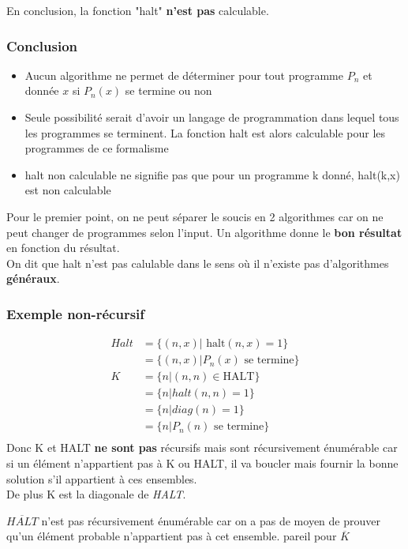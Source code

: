 \documentclass{report}
\begin{document}
En conclusion, la fonction "halt" \textbf{n'est pas} calculable.

\subsubsection{Conclusion}
\begin{itemize}
\item  Aucun algorithme ne permet de déterminer pour tout programme $P_n$ et donnée $x$ si $P_n(x)$ se termine ou non
\item Seule possibilité serait d’avoir un langage de programmation dans lequel tous les programmes se terminent. La fonction halt est alors calculable pour les programmes de ce formalisme
\item halt non calculable ne signifie pas que pour un programme k donné, halt(k,x) est
non calculable
\end{itemize}
Pour le premier point, on ne peut séparer le soucis en 2 algorithmes car on ne peut changer de programmes selon l'input. Un algorithme donne le \textbf{bon résultat} en fonction du résultat.\\

On dit que halt n'est pas calulable dans le sens où il n'existe pas d'algorithmes \textbf{généraux}.

\subsubsection{Exemple non-récursif}

\begin{align*}
Halt &= \{(n,x) | \text{ halt}(n,x) = 1\}\\
&= \{(n,x) | P_n (x) \text{ se termine}\}\\
K &= \{n | (n,n) \in \text{HALT}\}\\
&= \{n | halt(n,n) = 1\}\\
&= \{n | diag(n) = 1\}\\
&= \{n | P_n(n) \text{ se termine}\}\\
\end{align*}
Donc K et HALT \textbf{ne sont pas} récursifs mais sont récursivement énumérable car si un élément n'appartient pas à K ou HALT, il va boucler mais fournir la bonne solution s'il appartient à ces ensembles.\\
De plus K est la diagonale de \textit{HALT}.

$\overline{HALT}$ n'est pas récursivement énumérable car on a pas de moyen de prouver qu'un élément probable n'appartient pas à cet ensemble. pareil pour $\overline{K}$
\end{document}
